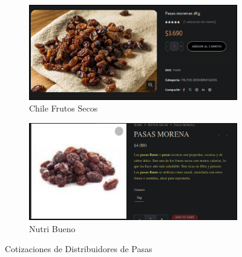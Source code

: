 \documentclass[12pt]{article}
\begin{document}
        \begin{figure}[H] %
            \centering
            \begin{subfigure}{0.4\textwidth}
                \centering
                \includegraphics[width=0.9\linewidth]{chile} %
                \caption{Chile Frutos Secos}
                \label{fig:chile_frutos_secos_pasas}
            \end{subfigure}
            \hfill
            \begin{subfigure}{0.45\textwidth}
                \centering
                \includegraphics[width=0.9\linewidth]{nutri} %
                \caption{Nutri Bueno}
                \label{fig:nutri_bueno_pasas}
            \end{subfigure}
            \caption{Cotizaciones de Distribuidores de Pasas}
            \label{fig:cotizaciones_pasas}
        \end{figure} %
\end{document}

